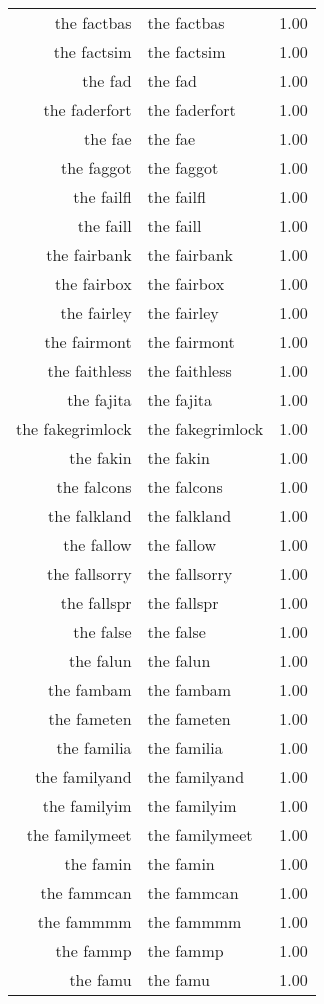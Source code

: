\begin{table}[ht]
\begin{tabular}{rlr}
  the factbas & the factbas & 1.00 \\ 
  the factsim & the factsim & 1.00 \\ 
  the fad & the fad & 1.00 \\ 
  the faderfort & the faderfort & 1.00 \\ 
  the fae & the fae & 1.00 \\ 
  the faggot & the faggot & 1.00 \\ 
  the failfl & the failfl & 1.00 \\ 
  the faill & the faill & 1.00 \\ 
  the fairbank & the fairbank & 1.00 \\ 
  the fairbox & the fairbox & 1.00 \\ 
  the fairley & the fairley & 1.00 \\ 
  the fairmont & the fairmont & 1.00 \\ 
  the faithless & the faithless & 1.00 \\ 
  the fajita & the fajita & 1.00 \\ 
  the fakegrimlock & the fakegrimlock & 1.00 \\ 
  the fakin & the fakin & 1.00 \\ 
  the falcons & the falcons & 1.00 \\ 
  the falkland & the falkland & 1.00 \\ 
  the fallow & the fallow & 1.00 \\ 
  the fallsorry & the fallsorry & 1.00 \\ 
  the fallspr & the fallspr & 1.00 \\ 
  the false & the false & 1.00 \\ 
  the falun & the falun & 1.00 \\ 
  the fambam & the fambam & 1.00 \\ 
  the fameten & the fameten & 1.00 \\ 
  the familia & the familia & 1.00 \\ 
  the familyand & the familyand & 1.00 \\ 
  the familyim & the familyim & 1.00 \\ 
  the familymeet & the familymeet & 1.00 \\ 
  the famin & the famin & 1.00 \\ 
  the fammcan & the fammcan & 1.00 \\ 
  the fammmm & the fammmm & 1.00 \\ 
  the fammp & the fammp & 1.00 \\ 
  the famu & the famu & 1.00 \\ 

\end{tabular}
\end{table}
